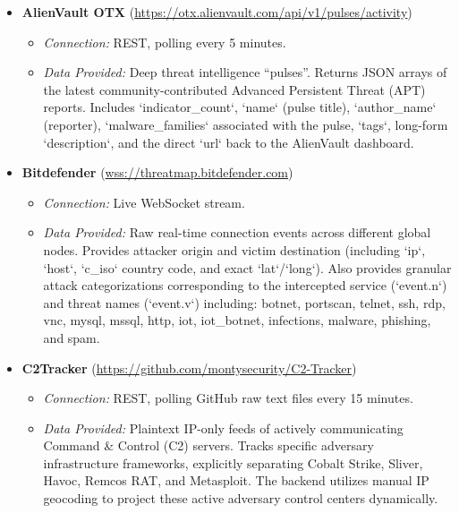 \documentclass[12pt,a4paper]{article}
\begin{document}
\begin{itemize}[leftmargin=*]
    \item \textbf{AlienVault OTX} (\url{https://otx.alienvault.com/api/v1/pulses/activity})
    \begin{itemize}[noitemsep]
        \item \textit{Connection:} REST, polling every 5 minutes.
        \item \textit{Data Provided:} Deep threat intelligence ``pulses''. Returns JSON arrays of the latest community-contributed Advanced Persistent Threat (APT) reports. Includes `indicator_count`, `name` (pulse title), `author_name` (reporter), `malware_families` associated with the pulse, `tags`, long-form `description`, and the direct `url` back to the AlienVault dashboard.
    \end{itemize}
    \vspace{0.3cm}

    \item \textbf{Bitdefender} (\url{wss://threatmap.bitdefender.com})
    \begin{itemize}[noitemsep]
        \item \textit{Connection:} Live WebSocket stream.
        \item \textit{Data Provided:} Raw real-time connection events across different global nodes. Provides attacker origin and victim destination (including `ip`, `host`, `c_iso` country code, and exact `lat`/`long`). Also provides granular attack categorizations corresponding to the intercepted service (`event.n`) and threat names (`event.v`) including: botnet, portscan, telnet, ssh, rdp, vnc, mysql, mssql, http, iot, iot\_botnet, infections, malware, phishing, and spam.
    \end{itemize}
    \vspace{0.3cm}

    \item \textbf{C2Tracker} (\url{https://github.com/montysecurity/C2-Tracker})
    \begin{itemize}[noitemsep]
        \item \textit{Connection:} REST, polling GitHub raw text files every 15 minutes.
        \item \textit{Data Provided:} Plaintext IP-only feeds of actively communicating Command \& Control (C2) servers. Tracks specific adversary infrastructure frameworks, explicitly separating Cobalt Strike, Sliver, Havoc, Remcos RAT, and Metasploit. The backend utilizes manual IP geocoding to project these active adversary control centers dynamically.
    \end{itemize}
    \vspace{0.3cm}


\end{itemize}
\end{document}

